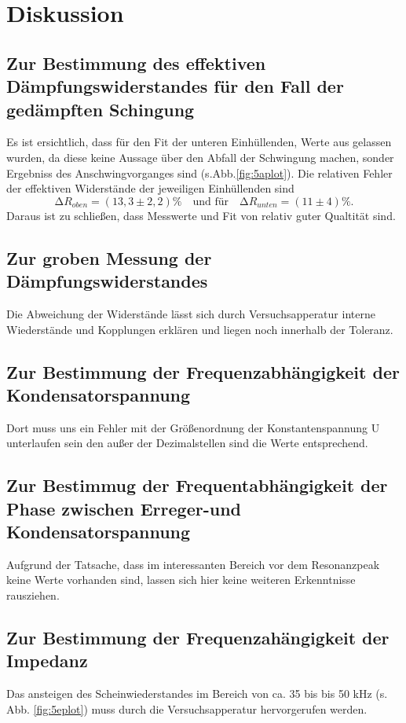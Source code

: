 \section{Diskussion}
\label{sec:Diskussion}
\subsection{Zur Bestimmung des effektiven Dämpfungswiderstandes für den Fall
der gedämpften Schingung}
  Es ist ersichtlich, dass für den Fit der unteren Einhüllenden,
  Werte aus gelassen wurden, da
  diese keine Aussage über den Abfall der Schwingung machen,
   sonder Ergebniss des Anschwingvorganges sind (s.Abb.\ref{fig:5aplot}).
  Die relativen Fehler der effektiven Widerstände der jeweiligen Einhüllenden
  sind
  \begin{equation*}
    \increment R_{oben} = (13,3 \pm 2,2) \% \quad \text{und für}\quad
    \increment R_{unten} = (11 \pm 4) \%.
  \end{equation*}
Daraus ist zu schließen, dass Messwerte und Fit von relativ guter Qualtität sind.
  \subsection{Zur groben Messung der Dämpfungswiderstandes}
  Die Abweichung der Widerstände lässt sich durch Versuchsapperatur interne Wiederstände und Kopplungen erklären
  und liegen noch innerhalb der Toleranz.
  \subsection{Zur Bestimmung der Frequenzabhängigkeit der Kondensatorspannung }
  Dort muss uns ein Fehler mit der Größenordnung der Konstantenspannung U unterlaufen sein den außer
  der Dezimalstellen sind die Werte entsprechend.
  \subsection{Zur Bestimmug der Frequentabhängigkeit der Phase zwischen
  Erreger-und Kondensatorspannung}
    Aufgrund der Tatsache, dass im interessanten Bereich
    vor dem Resonanzpeak keine Werte vorhanden sind,
    lassen sich hier keine weiteren Erkenntnisse rausziehen.
  \subsection{Zur Bestimmung der Frequenzahängigkeit der Impedanz}
   Das ansteigen des Scheinwiederstandes im Bereich von ca. 35 bis
   bis 50 kHz (s. Abb. \ref{fig:5eplot}) muss durch die Versuchsapperatur
   hervorgerufen werden.

